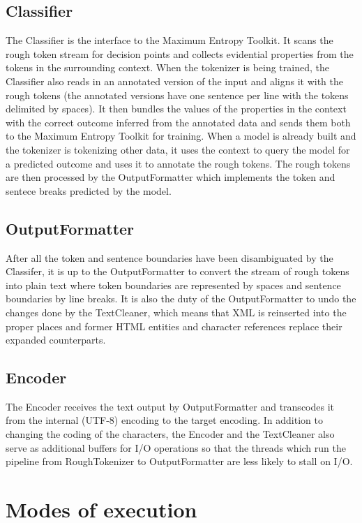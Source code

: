 \subsection{Classifier}

The Classifier is the interface to the Maximum Entropy Toolkit. It scans the
rough token stream for decision points and collects evidential properties from
the tokens in the surrounding context. When the tokenizer is being trained, the
Classifier also reads in an annotated version of the input and aligns it with
the rough tokens (the annotated versions have one sentence per line with the
tokens delimited by spaces). It then bundles the values of the properties in
the context with the correct outcome inferred from the annotated data and sends
them both to the Maximum Entropy Toolkit for training. When a model is already
built and the tokenizer is tokenizing other data, it uses the context to query
the model for a predicted outcome and uses it to annotate the rough tokens. The
rough tokens are then processed by the OutputFormatter which implements the
token and sentece breaks predicted by the model.

\subsection{OutputFormatter}

After all the token and sentence boundaries have been disambiguated by the
Classifer, it is up to the OutputFormatter to convert the stream of rough
tokens into plain text where token boundaries are represented by spaces and
sentence boundaries by line breaks. It is also the duty of the OutputFormatter
to undo the changes done by the TextCleaner, which means that XML is reinserted
into the proper places and former HTML entities and character references
replace their expanded counterparts.

\subsection{Encoder}

The Encoder receives the text output by OutputFormatter and transcodes it from
the internal (UTF-8) encoding to the target encoding. In addition to changing
the coding of the characters, the Encoder and the TextCleaner also serve as
additional buffers for I/O operations so that the threads which run the
pipeline from RoughTokenizer to OutputFormatter are less likely to stall on
I/O.


\section{Modes of execution}
\label{sec:impl-modes}

